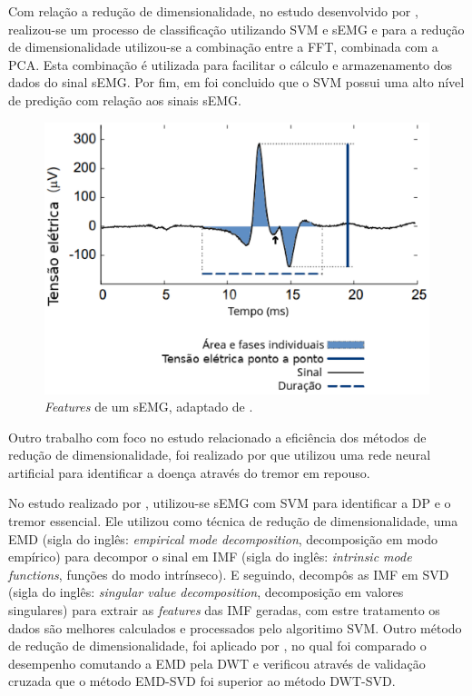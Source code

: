 Com relação a redução de dimensionalidade, no estudo desenvolvido por , realizou-se um processo de classificação utilizando SVM e sEMG e para a redução de dimensionalidade utilizou-se a combinação entre a FFT, combinada com a PCA. Esta combinação é utilizada para facilitar o cálculo e armazenamento dos dados do sinal sEMG. Por fim, em  foi concluido que o SVM possui uma alto nível de predição com relação aos sinais sEMG.

\begin{figure}[h]
    \centering
     \includegraphics[width=1\textwidth]{figuras/featuresEMG.eps}
     \caption{\textit{Features} de um sEMG, adaptado de .}
     \label{featuresEMG}
 \end{figure}

Outro trabalho com foco no estudo relacionado a eficiência dos métodos de redução de dimensionalidade, foi realizado por  que utilizou uma rede neural artificial para identificar a doença através do tremor em repouso. 

No estudo realizado por , utilizou-se sEMG com SVM para identificar a DP e o tremor essencial. Ele utilizou como técnica de redução de dimensionalidade, uma EMD (sigla do inglês: \textit{empirical mode decomposition}, decomposição em modo empírico) para decompor o sinal em IMF (sigla do inglês: \textit{intrinsic mode functions}, funções do modo intrínseco). E seguindo, decompôs as IMF em SVD (sigla do inglês: \textit{singular value decomposition}, decomposição em valores singulares) para extrair as \textit{features} das IMF geradas, com estre tratamento os dados são melhores calculados e processados pelo algoritimo SVM. Outro método de redução de dimensionalidade, foi aplicado por , no qual foi comparado o desempenho comutando a EMD pela DWT e verificou através de validação cruzada que o método EMD-SVD foi superior ao método DWT-SVD.

